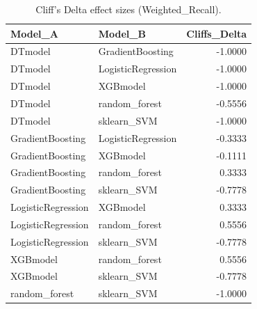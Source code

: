 \begin{table}[t]
\centering
\begin{tabular}{llr}
\toprule
Model_A & Model_B & Cliffs_Delta \\
\midrule
DTmodel & GradientBoosting & -1.0000 \\
DTmodel & LogisticRegression & -1.0000 \\
DTmodel & XGBmodel & -1.0000 \\
DTmodel & random_forest & -0.5556 \\
DTmodel & sklearn_SVM & -1.0000 \\
GradientBoosting & LogisticRegression & -0.3333 \\
GradientBoosting & XGBmodel & -0.1111 \\
GradientBoosting & random_forest & 0.3333 \\
GradientBoosting & sklearn_SVM & -0.7778 \\
LogisticRegression & XGBmodel & 0.3333 \\
LogisticRegression & random_forest & 0.5556 \\
LogisticRegression & sklearn_SVM & -0.7778 \\
XGBmodel & random_forest & 0.5556 \\
XGBmodel & sklearn_SVM & -0.7778 \\
random_forest & sklearn_SVM & -1.0000 \\
\bottomrule
\end{tabular}
\caption{Cliff's Delta effect sizes (Weighted_Recall).}
\label{tab:cliffs_Weighted_Recall}
\end{table}